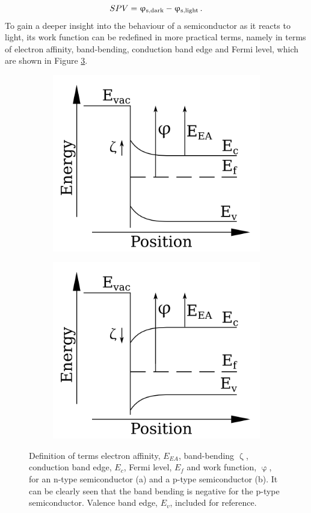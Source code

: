 \begin{equation}
\label{spvs}
	SPV = \upvarphi _{\text{s,dark}} - \upvarphi _{\text{s,light}} \, .
\end{equation}
To gain a deeper insight into the behaviour of a semiconductor as it reacts to light, its work function can be redefined in more practical terms, namely in terms of electron affinity, band-bending, conduction band edge and Fermi level, which are shown in Figure \ref{fig:terms}. 
\begin{figure}
\begin{subfigure}{0.5\textwidth}
\centering
	\includegraphics[width=0.8\linewidth]{./figs/bbdefn}
	\caption{}
	\label{fig:bbdefn}
\end{subfigure}
\begin{subfigure}{0.5\textwidth}
\centering
	\includegraphics[width=0.8\linewidth]{./figs/bbdefp}
	\caption{}
	\label{fig:bbdefp}
\end{subfigure}
\caption{Definition of terms electron affinity, $E_{EA}$, band-bending $\upzeta$, conduction band edge, $E_c$, Fermi level, $E_f$ and work function, $\upvarphi$, for an n-type semiconductor (a) and a p-type semiconductor (b). It can be clearly seen that the band bending is negative for the p-type semiconductor. Valence band edge, $E_v$, included for reference.}
\label{fig:terms}
\end{figure}
